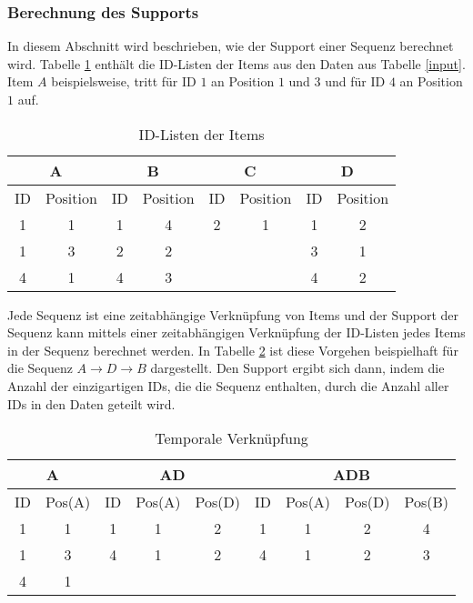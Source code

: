 \subsubsection*{Berechnung des Supports}
In diesem Abschnitt wird beschrieben, wie der Support einer Sequenz berechnet wird. Tabelle \ref{idlist} enthält die ID-Listen der Items aus den Daten aus Tabelle \ref{input}. Item $A$ beispielsweise, tritt für ID $1$ an Position $1$ und $3$ und für ID $4$ an Position $1$ auf.\\
\begin{table}[H]
\centering
\begin{tabular}{c|c|c|c|c|c|c|c}
\multicolumn{2}{c|}{A} & \multicolumn{2}{c|}{B} & \multicolumn{2}{c|}{C} & \multicolumn{2}{c}{D} \\ \hline
ID & Position  & ID & Position  & ID & Position  & ID & Position  \\ \hline
1	 & 1				 & 1  & 4				  & 2  & 1				 & 1  & 2 \\
1  & 3				 & 2  &	2			    &    &  				 & 3  & 1 \\
4  & 1				 & 4  &	3			    &    &  				 & 4  & 2 
\end{tabular}
\caption{ID-Listen der Items}\label{idlist}
\end{table}
\noindent Jede Sequenz ist eine zeitabhängige Verknüpfung von Items und der Support der Sequenz kann mittels einer zeitabhängigen Verknüpfung der ID-Listen jedes Items in der Sequenz berechnet werden. In Tabelle \ref{tempjoin} ist diese Vorgehen beispielhaft für die Sequenz $A\rightarrow D\rightarrow B$ dargestellt. Den Support ergibt sich dann, indem die Anzahl der einzigartigen IDs, die die Sequenz enthalten, durch die Anzahl aller IDs in den Daten geteilt wird.\\
\begin{table}[H]
\centering
\begin{tabular}{c|c||c|c|c||c|c|c|c}
\multicolumn{2}{c||}{A} & \multicolumn{3}{c||}{AD} & \multicolumn{4}{c}{ADB} \\ \hline \hline
ID & Pos(A) 	    		  & ID & Pos(A) & Pos(D) 		 & ID & Pos(A) & Pos(D) & Pos(B) \\ \hline
1  & 1									& 1  & 1			& 2          & 1  & 1			 & 2      & 4 \\
1  & 3									& 4  & 1      & 2          & 4  & 1      & 2      & 3 \\
4  & 1									& 	 & 				&            & 	  & 			 &        &	
\end{tabular}
\caption{Temporale Verknüpfung}\label{tempjoin}
\end{table}
